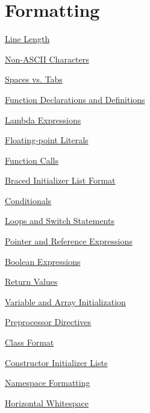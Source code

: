 
\chapter{Formatting}\label{ch:formatting}

\begin{introduction}
    \item \hyperref[sec:line-length]{Line Length}
    \item \hyperref[sec:non-ascii-characters]{Non-ASCII Characters}
    \item \hyperref[sec:spaces-vs.-tabs]{Spaces vs. Tabs}
    \item \hyperref[sec:function-declarations-and-definitions]{Function Declarations and Definitions}
    \item \hyperref[sec:lambda-expressions]{Lambda Expressions}
    \item \hyperref[sec:floating-point-literals]{Floating-point Literals}
    \item \hyperref[sec:function-calls]{Function Calls}
    \item \hyperref[sec:braced-initializer-list-format]{Braced Initializer List Format}
    \item \hyperref[sec:conditionals]{Conditionals}
    \item \hyperref[sec:loops-and-switch-statements]{Loops and Switch Statements}
    \item \hyperref[sec:pointer-and-reference-expressions]{Pointer and Reference Expressions}
    \item \hyperref[sec:boolean-expressions]{Boolean Expressions}
    \item \hyperref[sec:return-values]{Return Values}
    \item \hyperref[sec:variable-and-array-initialization]{Variable and Array Initialization}
    \item \hyperref[sec:preprocessor-directives]{Preprocessor Directives}
    \item \hyperref[sec:class-format]{Class Format}
    \item \hyperref[sec:constructor-initializer-lists]{Constructor Initializer Lists}
    \item \hyperref[sec:namespace-formatting]{Namespace Formatting}
    \item \hyperref[sec:horizontal-whitespace]{Horizontal Whitespace}
\end{introduction}

